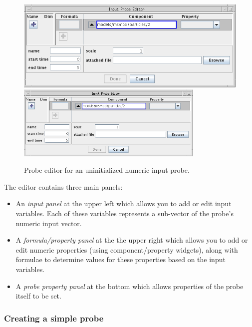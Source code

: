 \documentclass{article}
\begin{document}
\begin{figure}
\begin{center}
\iflatexml
\includegraphics[]{images/inputProbeEditorA}
\else
\includegraphics[width=0.80\textwidth]{images/inputProbeEditorA}
\fi
\end{center}
\caption{Probe editor for an uninitialized numeric input probe.}%
\label{InputProbeEditorAFig}
\end{figure}

The editor contains three main panels:

\begin{itemize}

\item An {\it input panel} at the upper left which allows you
to add or edit input variables. Each of these variables represents
a sub-vector of the probe's numeric input vector.

\item A {\it formula/property panel} at the the upper right which allows you
to add or edit numeric properties (using component/property widgets),
along with formulae to determine values for these properties based on
the input variables.

\item A {\it probe property panel} at the bottom which allows properties of
the probe itself to be set.

\end{itemize}

\subsubsection{Creating a simple probe}
\label{simpleInputProbeSec}
\end{document}
